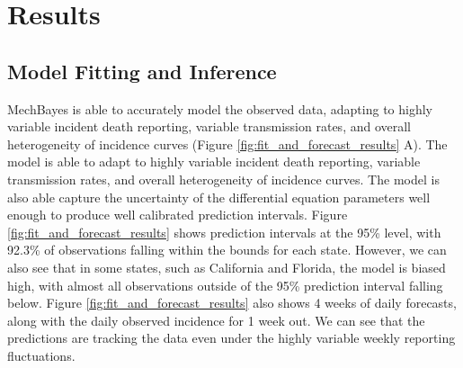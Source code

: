 \documentclass[11pt]{amsart}
\begin{document}
	
% 
%
\section{Results}

\subsection{Model Fitting and Inference}

MechBayes is able to accurately model the observed data, adapting to highly variable incident death reporting, variable transmission rates, and overall heterogeneity of incidence curves (Figure \ref{fig:fit_and_forecast_results} A). The model is able to adapt to highly variable incident death reporting, variable transmission rates, and overall heterogeneity of incidence curves. The model is also able capture the uncertainty of the differential equation parameters well enough to produce well calibrated prediction intervals. Figure \ref{fig:fit_and_forecast_results}  shows prediction intervals at the 95\% level, with 92.3\% of observations falling within the bounds for each state. However, we can also see that in some states, such as California and Florida, the model is biased high, with almost all observations outside of the 95\% prediction interval falling below. Figure \ref{fig:fit_and_forecast_results}  also shows 4 weeks of daily forecasts, along with the daily observed incidence for 1 week out. We can see that the predictions are tracking the data even under the highly variable weekly reporting fluctuations. 
\end{document}
